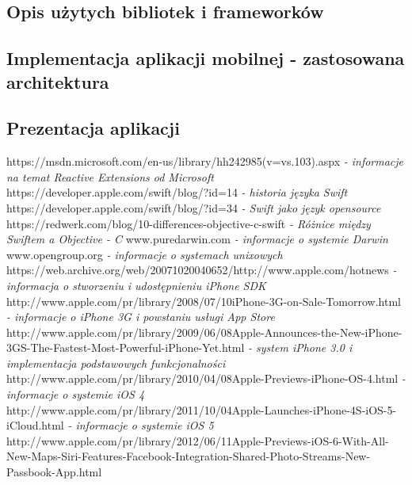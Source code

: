\documentclass[11pt,twoside,a4paper]{report}
\begin{document}
\subsection{Opis użytych bibliotek i frameworków}
\subsection{Implementacja aplikacji mobilnej - zastosowana architektura}
\subsection{Prezentacja aplikacji}
\begin{thebibliography}{50}
 https://msdn.microsoft.com/en-us/library/hh242985(v=vs.103).aspx
\emph{- informacje na temat Reactive Extensions od Microsoft}
 https://developer.apple.com/swift/blog/?id=14
\emph{- historia języka Swift}
 https://developer.apple.com/swift/blog/?id=34
\emph{- Swift jako język opensource}
 https://redwerk.com/blog/10-differences-objective-c-swift
\emph{- Różnice między Swiftem a Objective - C}
 www.puredarwin.com 
\emph{ - informacje o systemie Darwin}
 www.opengroup.org \emph{ - informacje o systemach unixowych}
 https://web.archive.org/web/20071020040652/http://www.apple.com/hotnews
\emph{ - informacja o stworzeniu i udostępnieniu iPhone SDK}
 http://www.apple.com/pr/library/2008/07/10iPhone-3G-on-Sale-Tomorrow.html
\emph{ - informacje o iPhone 3G i powstaniu usługi App Store}
 http://www.apple.com/pr/library/2009/06/08Apple-Announces-the-New-iPhone-3GS-The-Fastest-Most-Powerful-iPhone-Yet.html
\emph{ - system iPhone 3.0 i implementacja podstawowych funkcjonalności}
http://www.apple.com/pr/library/2010/04/08Apple-Previews-iPhone-OS-4.html
\emph{ - informacje o systemie iOS 4}
http://www.apple.com/pr/library/2011/10/04Apple-Launches-iPhone-4S-iOS-5-iCloud.html
\emph{ - informacje o systemie iOS 5}
http://www.apple.com/pr/library/2012/06/11Apple-Previews-iOS-6-With-All-New-Maps-Siri-Features-Facebook-Integration-Shared-Photo-Streams-New-Passbook-App.html

\end{thebibliography}
\end{document}
